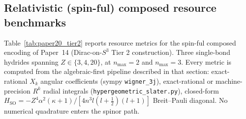 \documentclass[twocolumn,pra,amsmath,amssymb,superscriptaddress]{revtex4-2}
\begin{document}
\subsection{Relativistic (spin-ful) composed resource benchmarks}
\label{subsec:paper20_tier2}

Table~\ref{tab:paper20_tier2} reports resource metrics for the
spin-ful composed encoding of Paper~14
(Dirac-on-$S^3$ Tier 2 construction). Three single-bond hydrides
spanning $Z \in \{3, 4, 20\}$, at $n_{\max} = 2$ and $n_{\max} = 3$.
Every metric is computed from the algebraic-first pipeline described
in that section: exact-rational $X_k$ angular coefficients (sympy
\texttt{wigner\_3j}), exact-rational or machine-precision $R^k$ radial
integrals (\texttt{hypergeometric\_slater.py}), closed-form
$H_{\mathrm{SO}} = -Z^4\alpha^2(\kappa+1)/[4 n^3 l(l+\tfrac{1}{2})(l+1)]$
Breit--Pauli diagonal. No numerical quadrature enters the spinor path.
\end{document}
